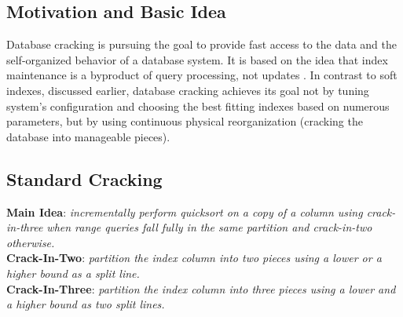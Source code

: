 \documentclass[10pt, conference, compsocconf]{IEEEtran}
\begin{document}
\subsection{Motivation and Basic Idea}
\label{subsec:crack_idea}
Database cracking is pursuing the goal to provide fast access to the data and the self-organized behavior of a database system. It is based on the idea that index maintenance is a byproduct of query processing, not updates \cite{cracking}. In contrast to soft indexes, discussed earlier, database cracking achieves its goal not by tuning system's configuration and choosing the best fitting indexes based on numerous parameters, but by using continuous physical reorganization (cracking the database into manageable pieces).

\subsection{Standard Cracking}
\label{subsec:st_crack}
\textbf{Main Idea}: \textit{incrementally perform quicksort on a copy of a column using crack-in-three when range queries fall fully in the same partition and crack-in-two otherwise.}\\

\textbf{Crack-In-Two}: \textit{partition the index column into two pieces using a lower or a higher bound as a split line.}\\

\textbf{Crack-In-Three}: \textit{partition the index column into three pieces using a lower and a higher bound as two split lines.}\\
\end{document}

